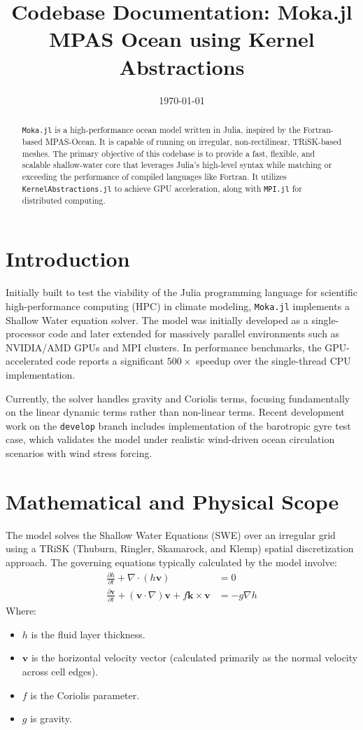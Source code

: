 \documentclass[12pt]{my-preprint}
\title{\textbf{Codebase Documentation: Moka.jl \\ \large MPAS Ocean using Kernel Abstractions}}
\author{}
\date{\today}
\begin{document}
\maketitle

\begin{abstract}
\noindent \texttt{Moka.jl} is a high-performance ocean model written in Julia, inspired by the Fortran-based MPAS-Ocean. It is capable of running on irregular, non-rectilinear, TRiSK-based meshes. The primary objective of this codebase is to provide a fast, flexible, and scalable shallow-water core that leverages Julia's high-level syntax while matching or exceeding the performance of compiled languages like Fortran. It utilizes \texttt{KernelAbstractions.jl} to achieve GPU acceleration, along with \texttt{MPI.jl} for distributed computing.
\end{abstract}

\section{Introduction}
Initially built to test the viability of the Julia programming language for scientific high-performance computing (HPC) in climate modeling, \texttt{Moka.jl} implements a Shallow Water equation solver. The model was initially developed as a single-processor code and later extended for massively parallel environments such as NVIDIA/AMD GPUs and MPI clusters. In performance benchmarks, the GPU-accelerated code reports a significant $500\times$ speedup over the single-thread CPU implementation. 

Currently, the solver handles gravity and Coriolis terms, focusing fundamentally on the linear dynamic terms rather than non-linear terms. Recent development work on the \texttt{develop} branch includes implementation of the barotropic gyre test case, which validates the model under realistic wind-driven ocean circulation scenarios with wind stress forcing.

\section{Mathematical and Physical Scope}
The model solves the Shallow Water Equations (SWE) over an irregular grid using a TRiSK (Thuburn, Ringler, Skamarock, and Klemp) spatial discretization approach.
The governing equations typically calculated by the model involve:
\begin{align}
    \frac{\partial h}{\partial t} + \nabla \cdot (h \mathbf{v}) &= 0 \\
    \frac{\partial \mathbf{v}}{\partial t} + (\mathbf{v} \cdot \nabla) \mathbf{v} + f \mathbf{k} \times \mathbf{v} &= -g \nabla h 
\end{align}
Where:
\begin{itemize}
    \item $h$ is the fluid layer thickness.
    \item $\mathbf{v}$ is the horizontal velocity vector (calculated primarily as the normal velocity across cell edges).
    \item $f$ is the Coriolis parameter.
    \item $g$ is gravity.
\end{itemize}
\end{document}
